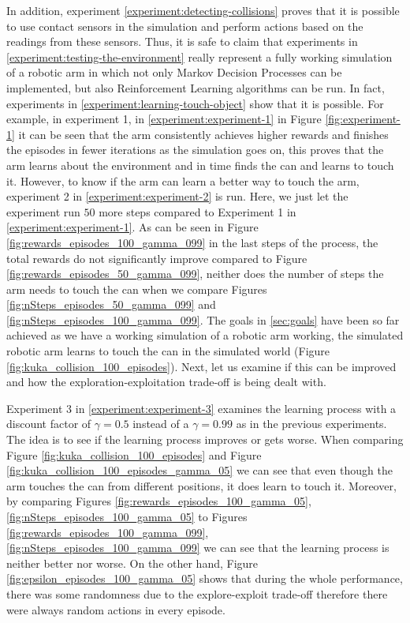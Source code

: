 \documentclass[12pt,oneside]{article}
\begin{document}
In addition, experiment \ref{experiment:detecting-collisions} proves that it is possible to use contact sensors in the simulation and perform actions based on the readings from these sensors. Thus, it is safe to claim that experiments in \ref{experiment:testing-the-environment} really represent a fully working simulation of a robotic arm in which not only Markov Decision Processes can be implemented, but also Reinforcement Learning algorithms can be run. In fact, experiments in \ref{experiment:learning-touch-object} show that it is possible. For example, in experiment 1, in \ref{experiment:experiment-1} in Figure \ref{fig:experiment-1} it can be seen that the arm consistently achieves higher rewards and finishes the episodes in fewer iterations as the simulation goes on, this proves that the arm learns about the environment and in time finds the can and learns to touch it. However, to know if the arm can learn a better way to touch the arm, experiment 2 in \ref{experiment:experiment-2} is run. Here, we just let the experiment run $50$ more steps compared to Experiment 1 in \ref{experiment:experiment-1}. As can be seen in Figure \ref{fig:rewards_episodes_100_gamma_099} in the last steps of the process, the total rewards do not significantly improve compared to Figure \ref{fig:rewards_episodes_50_gamma_099}, neither does the number of steps the arm needs to touch the can when we compare Figures \ref{fig:nSteps_episodes_50_gamma_099} and \ref{fig:nSteps_episodes_100_gamma_099}. The goals in \ref{sec:goals} have been so far achieved as we have a working simulation of a robotic arm working, the simulated robotic arm learns to touch the can in the simulated world (Figure \ref{fig:kuka_collision_100_episodes}). Next, let us examine if this can be improved and how the exploration-exploitation trade-off is being dealt with. 

Experiment 3 in \ref{experiment:experiment-3} examines the learning process with a discount factor of $\gamma = 0.5$ instead of a $\gamma = 0.99$ as in the previous experiments. The idea is to see if the learning process improves or gets worse. When comparing Figure \ref{fig:kuka_collision_100_episodes} and Figure \ref{fig:kuka_collision_100_episodes_gamma_05} we can see that even though the arm touches the can from different positions, it does learn to touch it. Moreover, by comparing Figures \ref{fig:rewards_episodes_100_gamma_05}, \ref{fig:nSteps_episodes_100_gamma_05} to Figures  \ref{fig:rewards_episodes_100_gamma_099}, \ref{fig:nSteps_episodes_100_gamma_099} we can see that the learning process is neither better nor worse. On the other hand, Figure \ref{fig:epsilon_episodes_100_gamma_05} shows that during the whole performance, there was some randomness due to the explore-exploit trade-off therefore there were always random actions in every episode.
\end{document}
